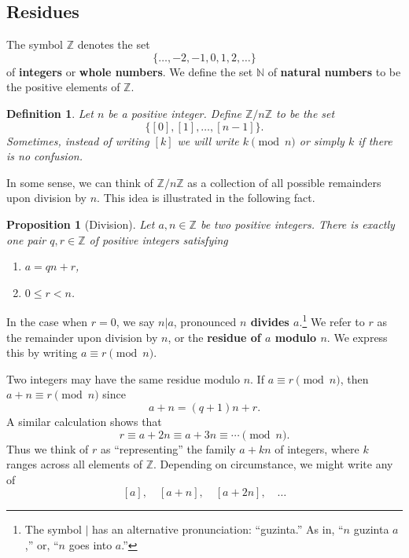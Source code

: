 \documentclass{article}
\newcommand{\blue}[1]{ {\color{blue}{#1}} }
\newcommand{\N}{\mathbb{N}}
\newcommand{\Z}{\mathbb{Z}}
\theoremstyle{plain}
\newtheorem{definition}{Definition}
\newtheorem{proposition}{Proposition}
\begin{document}
\subsection{Residues}

The symbol $\Z$ denotes the set
\[
    \{ \dots, -2, -1, 0, 1, 2, \dots\}
\]
of \textbf{integers} or \textbf{whole numbers}.
We define the set $\N$ of \textbf{natural numbers} to be the positive elements of $\Z$.

\begin{definition}
    Let $n$ be a positive integer.
    Define $\Z/n\Z$ to be the set 
    \[
        \{ [0], [1], \dots, [n-1] \}.
    \]
    Sometimes, instead of writing $[k]$ we will write $k\pmod{n}$
    or simply $k$ if there is no confusion.
\end{definition}

In some sense, we can think of $\Z/n\Z$ as a collection of all possible 
remainders upon division by $n$.
This idea is illustrated in the following fact.

\begin{proposition}[Division]\label{prop:div}
    Let $a,n \in \Z$ be two positive integers.
    There is exactly one pair $q,r\in\Z$ of positive integers satisfying 
    \begin{enumerate}
        \item $a = qn+r$,
        \item $0\leq r < n$.
    \end{enumerate}
\end{proposition}

\blue{
\begin{proof}
    To do.
\end{proof}
}

In the case when $r=0$, we say $n|a$, pronounced \textbf{$n$ divides $a$}.\footnote{
    The symbol $|$ has an alternative pronunciation: ``guzinta.''
As in, ``$n$ guzinta $a$,'' or, ``$n$ goes into $a$.''}
We refer to $r$ as the remainder upon division by $n$, or 
the \textbf{residue of $a$ modulo $n$}.
We express this by writing $a \equiv r \pmod{n}$.

Two integers may have the same residue modulo $n$.
If $a \equiv r \pmod{n}$, then $a+n \equiv r \pmod{n}$ since 
\[ 
    a+n = (q+1)n + r.
\] 
A similar calculation shows that
\[
    r \equiv a+2n \equiv a+3n \equiv \cdots \pmod{n}.
\]
Thus we think of $r$ as ``representing'' the family $a+kn$ of integers, where $k$
ranges across all elements of $\Z$.
Depending on circumstance, we might write any of 
\[
    [a], \quad [a+n], \quad [a+2n], \quad \dots
\]
\end{document}
